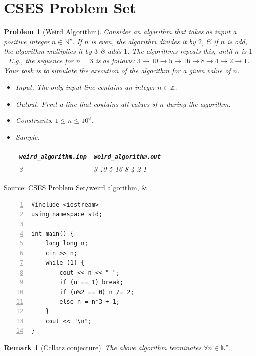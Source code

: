 \documentclass{article}
\newtheorem{problem}{Problem}
\newtheorem{remark}{Remark}
\begin{document}
\section{CSES Problem Set}

\begin{problem}[Weird Algorithm]
	Consider an algorithm that takes as input a positive integer $n\in\mathbb{N}^\star$. If $n$ is even, the algorithm divides it by $2$, \& if $n$ is odd, the algorithm multiplies it by $3$ \& adds $1$. The algorithms repeats this, until $n$ is $1$. E.g., the sequence for $n = 3$ is as follows: $3\to10\to5\to16\to8\to4\to2\to1$. Your task is to simulate the execution of the algorithm for a given value of $n$.
	\begin{itemize}
		\item {\sf Input.} The only input line contains an integer $n\in\mathbb{Z}$.
		\item {\sf Output.} Print a line that contains all values of $n$ during the algorithm.
		\item {\sf Constraints.} $1\le n\le10^6$.
		\item {\sf Sample.}
		\begin{table}[H]
			\centering
			\begin{tabular}{|l|l|}
				\hline
				\verb|weird_algorithm.inp| & \verb|weird_algorithm.out| \\
				\hline
				3 & 3 10 5 16 8 4 2 1 \\
				\hline
			\end{tabular}
		\end{table}
	\end{itemize}
\end{problem}
Source: \href{https://cses.fi/problemset/task/1068}{CSES Problem Set\texttt{/}weird algorithm}, \& \cite[Sect. 1.3, pp. 5--7]{Laaksonen2020}.

\begin{Verbatim}[numbers=left,xleftmargin=5mm]
#include <iostream>
using namespace std;

int main() {
    long long n;
    cin >> n;
    while (1) {
        cout << n << " ";
        if (n == 1) break;
        if (n%2 == 0) n /= 2;
        else n = n*3 + 1;
    }
    cout << "\n";
}
\end{Verbatim}

\begin{remark}[Collatz conjecture]
	The above algorithm terminates $\forall n\in\mathbb{N}^\star$.
\end{remark}
\end{document}
